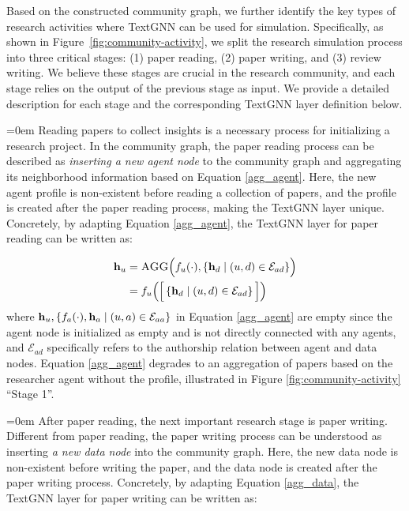 Based on the constructed community graph, we further identify the key types of research activities where TextGNN can be used for simulation.
Specifically, as shown in Figure~\ref{fig:community-activity}, we split the research simulation process into three critical stages: (1) paper reading, (2) paper writing, and (3) review writing. We believe these stages are crucial in the research community, and each stage relies on the output of the previous stage as input. 
We provide a detailed description for each stage and the corresponding TextGNN layer definition below.

\hangindent=0em
 Reading papers to collect insights is a necessary process for initializing a research project. In the community graph, the paper reading process can be described as \textit{inserting a new agent node} to the community graph and aggregating its neighborhood information based on Equation \ref{agg_agent}. Here, the new agent profile is non-existent before reading a collection of papers, and the profile is created after the paper reading process, making the TextGNN layer unique. Concretely, by adapting Equation \ref{agg_agent}, the TextGNN layer for paper reading can be written as:

\vspace{-6mm}
\begingroup
\small
\begin{equation}
\begin{split}
    \mathbf{h}_{u} & = \textsc{AGG}\Big(f_u(\cdot), \{\mathbf{h}_d \mid (u,d) \in \mathcal{E}_{ad}\}\Big) \\
    & = f_u\Big(\Big[\left\{\mathbf{h}_d \mid (u,d) \in \mathcal{E}_{ad}\right\}\Big]\Big)
\end{split}
\label{paper_reading}
\end{equation}
\endgroup
where $\mathbf{h}_u, \{f_a(\cdot), \mathbf{h}_a \mid (u, a) \in \mathcal{E}_{aa}\}$ in Equation \ref{agg_agent} are empty since the agent node is initialized as empty and is not directly connected with any agents, and $\mathcal{E}_{ad}$ specifically refers to the authorship relation between agent and data nodes. Equation \ref{agg_agent} degrades to an aggregation of papers based on the researcher agent without the profile, illustrated in Figure \ref{fig:community-activity} ``Stage 1''.

\hangindent=0em
 After paper reading, the next important research stage is paper writing. Different from paper reading, the paper writing process can be understood as inserting \textit{a new data node} into the community graph. Here, the new data node is non-existent before writing the paper, and the data node is created after the paper writing process. Concretely, by adapting Equation \ref{agg_data}, the TextGNN layer for paper writing can be written as:

